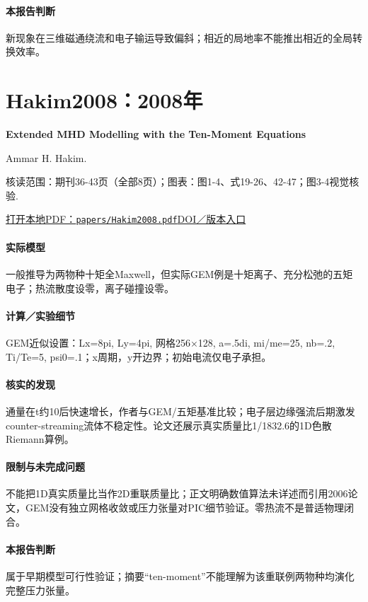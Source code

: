 \paragraph{本报告判断}新现象在三维磁通绕流和电子输运导致偏斜；相近的局地率不能推出相近的全局转换效率。

\section{Hakim2008：2008年}\label{paper:Hakim2008}

\textbf{Extended MHD Modelling with the Ten-Moment Equations}\citep{Hakim2008}\

Ammar H. Hakim.

\textsf{核读范围：}期刊36-43页（全部8页）；\textsf{图表：}图1-4、式19-26、42-47；图3-4视觉核验.

\href{run:papers/Hakim2008.pdf}{打开本地PDF：\texttt{papers/Hakim2008.pdf}}\quad\href{https://doi.org/10.1007/s10894-007-9116-z}{DOI／版本入口}

\paragraph{实际模型}一般推导为两物种十矩全Maxwell，但实际GEM例是十矩离子、充分松弛的五矩电子；热流散度设零，离子碰撞设零。

\paragraph{计算／实验细节}GEM近似设置：Lx=8pi, Ly=4pi, 网格256×128, a=.5di, mi/me=25, nb=.2, Ti/Te=5, psi0=.1；x周期，y开边界；初始电流仅电子承担。

\paragraph{核实的发现}通量在t约10后快速增长，作者与GEM/五矩基准比较；电子层边缘强流后期激发counter-streaming流体不稳定性。论文还展示真实质量比1/1832.6的1D色散Riemann算例。

\paragraph{限制与未完成问题}不能把1D真实质量比当作2D重联质量比；正文明确数值算法未详述而引用2006论文，GEM没有独立网格收敛或压力张量对PIC细节验证。零热流不是普适物理闭合。

\paragraph{本报告判断}属于早期模型可行性验证；摘要“ten-moment”不能理解为该重联例两物种均演化完整压力张量。

